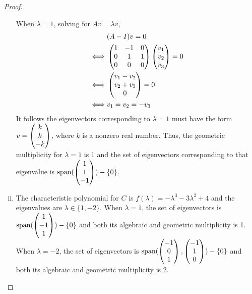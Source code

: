 \begin{proof}
\begin{enumerate}[(i)]
              When $\lambda=1$, solving for $Av=\lambda v$,
              \[
                  \begin{aligned}
                       & (A-I)v=0                   \\
                      \iff
                       & \begin{pmatrix}
                            1 & -1 & 0\\
                            0 & 1 & 1\\
                            0 & 0 & 0
                       \end{pmatrix}\begin{pmatrix} v_1\\ v_2\\ v_3\end{pmatrix}=0\\
                        \iff
                        &\begin{pmatrix} v_1-v_2\\ v_2+v_3\\ 0\end{pmatrix}=0\\
                        \iff
                        &v_1=v_2=-v_3
                  \end{aligned}\\
              \]
                It follows the eigenvectors corresponding to $\lambda=1$ must have the form $v=\begin{pmatrix} k\\ k\\ -k\end{pmatrix}$, where $k$ is a nonzero real number.
                Thus, the geometric multiplicity for $\lambda=1$ is 1 and the set of eigenvectors corresponding to that eigenvalue is $\textnormal{span}(\begin{pmatrix} 1\\ 1\\ -1\end{pmatrix})-\{0\}$.
        \item The characteristic polynomial for $C$ is $f(\lambda)=-\lambda^3-3\lambda^2+4$ and the eigenvalues are $\lambda\in\{1,-2\}$.
        When $\lambda=1$, the set of eigenvectors is $\textnormal{span}(\begin{pmatrix} 1\\ -1\\ 1\end{pmatrix})-\{0\}$ and both its algebraic and geometric multiplicity is 1.
        When $\lambda=-2$, the set of eigenvectors is $\textnormal{span}(\begin{pmatrix} -1\\ 0\\ 1\end{pmatrix},\begin{pmatrix} -1\\ 1\\ 0\end{pmatrix})-\{0\}$ and both its algebraic and geometric multiplicity is 2.
    \end{enumerate}
    \renewcommand{\qedsymbol}{}
\end{proof}